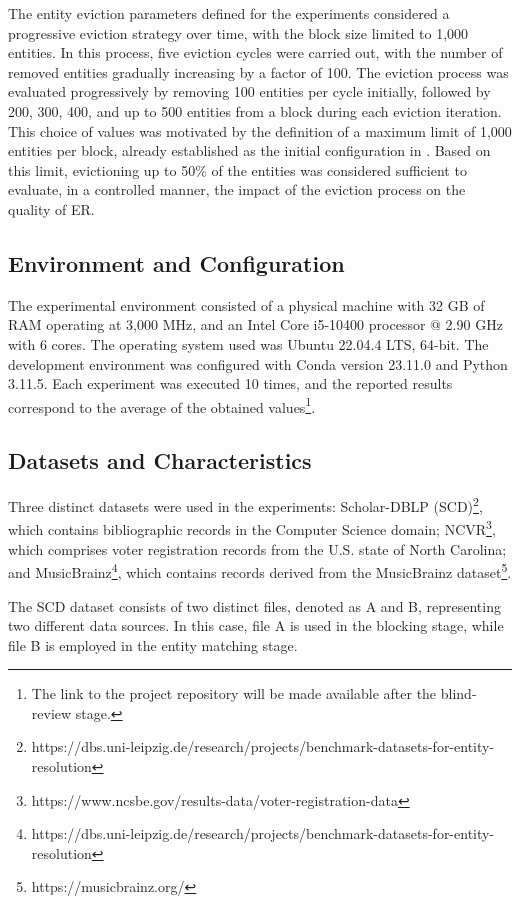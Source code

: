 \documentclass{ieeeaccess}
\begin{document}
The entity eviction parameters defined for the experiments considered a progressive eviction strategy over time, with the block size limited to 1,000 entities. In this process, five eviction cycles were carried out, with the number of removed entities gradually increasing by a factor of 100. The eviction process was evaluated progressively by removing 100 entities per cycle initially, followed by 200, 300, 400, and up to 500 entities from a block during each eviction iteration. This choice of values was motivated by the definition of a maximum limit of 1,000 entities per block, already established as the initial configuration in \cite{10.1109/TKDE.2024.3361022}. Based on this limit, evictioning up to 50\% of the entities was considered sufficient to evaluate, in a controlled manner, the impact of the eviction process on the quality of ER.

\subsection{Environment and Configuration}
The experimental environment consisted of a physical machine with 32 GB of RAM operating at 3{,}000 MHz, and an Intel Core i5-10400 processor @ 2.90 GHz with 6 cores. The operating system used was Ubuntu 22.04.4 LTS, 64-bit. The development environment was configured with Conda version 23.11.0 and Python 3.11.5. Each experiment was executed 10 times, and the reported results correspond to the average of the obtained values\footnote{The link to the project repository will be made available after the blind-review stage.}.

\subsection{Datasets and Characteristics}
Three distinct datasets were used in the experiments: Scholar-DBLP (SCD)\footnote{https://dbs.uni-leipzig.de/research/projects/benchmark-datasets-for-entity-resolution}, which contains bibliographic records in the Computer Science domain; NCVR\footnote{https://www.ncsbe.gov/results-data/voter-registration-data}, which comprises voter registration records from the U.S. state of North Carolina; and MusicBrainz\footnote{https://dbs.uni-leipzig.de/research/projects/benchmark-datasets-for-entity-resolution}, which contains records derived from the MusicBrainz dataset\footnote{https://musicbrainz.org/}.

The SCD dataset consists of two distinct files, denoted as A and B, representing two different data sources. In this case, file A is used in the blocking stage, while file B is employed in the entity matching stage.
\end{document}
